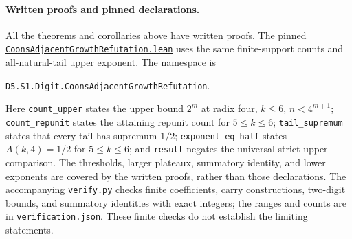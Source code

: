 \documentclass[11pt]{article}
\begin{document}
\normalsize

\paragraph{Written proofs and pinned declarations.}
All the theorems and corollaries above have written proofs.
The pinned
\href{https://github.com/the-omega-institute/trureturing/blob/87004d7eb03533d5078ed293778a5b22c8d99aa2/D5/S1/Digit/CoonsAdjacentGrowthRefutation.lean}{\nolinkurl{CoonsAdjacentGrowthRefutation.lean}}
uses the same finite-support counts and all-natural-tail upper exponent.
The namespace is
\begin{center}\texttt{D5.S1.Digit.CoonsAdjacentGrowthRefutation}.\end{center}
Here \texttt{count\_upper} states the upper bound $2^m$ at radix four,
$k\le6$, $n<4^{m+1}$;
\texttt{count\_repunit} states the attaining repunit count for
$5\le k\le6$;
\texttt{tail\_supremum} states that every tail has supremum $1/2$;
\texttt{exponent\_eq\_half} states $A(k,4)=1/2$ for $5\le k\le6$;
and \texttt{result} negates the universal strict upper comparison.
The thresholds, larger plateaux, summatory identity, and lower exponents
are covered by the written proofs, rather than those declarations.
The accompanying \texttt{verify.py} checks finite coefficients,
carry constructions, two-digit bounds, and summatory identities with
exact integers; the ranges and counts are in \texttt{verification.json}.
These finite checks do not establish the limiting statements.
\end{document}
